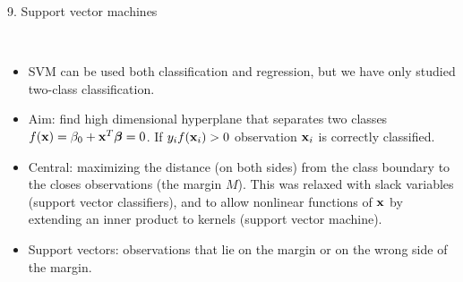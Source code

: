 \documentclass[10pt,ignorenonframetext,]{beamer}
\providecommand{\tightlist}{%
  \setlength{\itemsep}{0pt}\setlength{\parskip}{0pt}}
\begin{document}
\begin{frame}

\begin{block}{9. Support vector machines}

\(~\)

\begin{itemize}
\tightlist
\item
  SVM can be used both classification and regression, but we have only
  studied two-class classification.
\end{itemize}

\vspace{2mm}

\begin{itemize}
\tightlist
\item
  Aim: find high dimensional hyperplane that separates two classes
  \(f({\bf x})=\beta_0+{\bf x}^T \boldsymbol\beta=0\). If
  \(y_if({\bf x}_i)>0\) observation \({\bf x}_i\) is correctly
  classified.
\end{itemize}

\vspace{2mm}

\begin{itemize}
\tightlist
\item
  Central: maximizing the distance (on both sides) from the class
  boundary to the closes observations (the margin \(M\)). This was
  relaxed with slack variables (support vector classifiers), and to
  allow nonlinear functions of \({\bf x}\) by extending an inner product
  to kernels (support vector machine).
\end{itemize}

\vspace{2mm}

\begin{itemize}
\tightlist
\item
  Support vectors: observations that lie on the margin or on the wrong
  side of the margin.
\end{itemize}

\end{block}

\end{frame}
\end{document}

